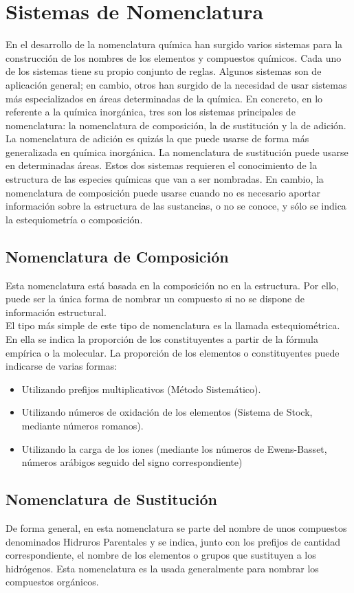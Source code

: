 \documentclass[11pt,fleqn]{book} %
\begin{document}
\section{Sistemas de Nomenclatura}
En el desarrollo de la nomenclatura química han surgido varios sistemas para la construcción de los nombres de los elementos y compuestos químicos. Cada uno de los sistemas tiene su propio conjunto de reglas.
Algunos sistemas son de aplicación general; en cambio, otros han surgido de la necesidad de usar sistemas más especializados en áreas determinadas de la química.
En concreto, en lo referente a la química inorgánica, tres son los sistemas principales de nomenclatura: la nomenclatura de composición, la de sustitución y la de adición.
La nomenclatura de adición es quizás la que puede usarse de forma más generalizada en química inorgánica. La nomenclatura de sustitución puede usarse en determinadas áreas. Estos dos sistemas requieren el conocimiento de la estructura de las especies químicas que van a ser nombradas. En cambio, la nomenclatura de composición puede usarse cuando no es necesario aportar información sobre la estructura de las sustancias, o no se conoce, y sólo se indica la estequiometría o composición.
\subsection{Nomenclatura de Composición}
Esta nomenclatura está basada en la composición no en la estructura. Por ello, puede ser la única forma de nombrar un compuesto si no se dispone de información estructural.\\
El tipo más simple de este tipo de nomenclatura es la llamada estequiométrica. En ella se indica la proporción de los constituyentes a partir de la fórmula empírica o la molecular. La proporción de los elementos o constituyentes puede indicarse de varias formas:\\
\begin{itemize}
	\item Utilizando prefijos multiplicativos (Método Sistemático). 
	\item Utilizando números de oxidación de los elementos (Sistema de Stock, mediante números romanos). 
	\item Utilizando la carga de los iones (mediante los números de Ewens-Basset, números arábigos seguido del signo correspondiente)
\end{itemize}
\subsection{Nomenclatura de Sustitución}
De forma general, en esta nomenclatura se parte del nombre de unos compuestos denominados Hidruros Parentales y se indica, junto con los prefijos de cantidad correspondiente, el nombre de los elementos o grupos que sustituyen a los hidrógenos. Esta nomenclatura es la usada generalmente para nombrar los compuestos orgánicos.
\end{document}

